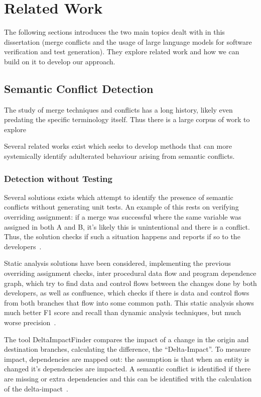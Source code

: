 \chapter{Related Work} \label{chap:rw}

The following sections introduces the two main topics dealt with in this dissertation (merge conflicts and the usage of large language models for software verification and test generation). They explore related work and how we can build on it to develop our approach.

\section{Semantic Conflict Detection}

The study of merge techniques and conflicts has a long history, likely even predating the specific terminology itself. Thus there is a large corpus of work to explore

Several related works exist which seeks to develop methods that can more systemically identify adulterated behaviour arising from semantic conflicts.

\subsection{Detection without Testing}

Several solutions exists which attempt to identify the presence of semantic conflicts without generating unit tests. An example of this rests on verifying overriding assignment: if a merge was successful where the same variable was assigned in both A and B, it's likely this is unintentional and there is a conflict. Thus, the solution checks if such a situation happens and reports if so to the developers~\cite{kn:assigne}.


Static analysis solutions have been considered, implementing the previous overriding assignment checks, inter procedural data flow and program dependence graph, which try to find data and control flows between the changes done by both developers, as well as confluence, which checks if there is data and control flows from both branches that flow into some common path. This static analysis shows much better F1 score and recall than dynamic analysis techniques, but much worse precision~\cite{kn:staticanal}.


The tool DeltaImpactFinder compares the impact of a change in the origin and destination branches, calculating the difference, the ``Delta-Impact''. To measure impact, dependencies are mapped out: the assumption is that when an entity is changed it's dependencies are impacted. A semantic conflict is identified if there are missing or extra dependencies and this can be identified with the calculation of the delta-impact~\cite{kn:deltaimpact}.

